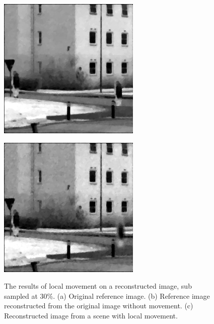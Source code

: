 \begin{figure}[H]
\begin{minipage}[t]{0.32\textwidth}
    \includegraphics[width = \textwidth]{result/dynamic/local/local_whole_time_ref.png}
    \subcaption{}
    \label{fig:local_2}
\end{minipage}
\begin{minipage}[t]{0.32\textwidth}
    \includegraphics[width = \textwidth]{result/dynamic/local/local_whole_time_res_psnr_29_snr_25_sssim_91.png}
    \subcaption{}
    \label{fig:local_3}
\end{minipage}
    \caption{The results of local movement on a reconstructed image, sub sampled at 30\%. (a) Original reference image. (b) Reference image reconstructed from the original image without movement. (c) Reconstructed image from a scene with local movement.}
    \label{fig:local_dyn}
\end{figure}

